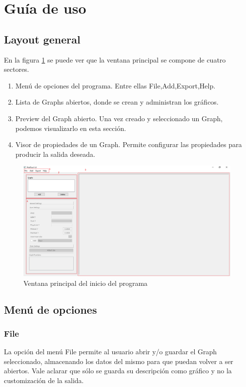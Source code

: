 \documentclass[a4paper,10pt]{article}
\begin{document}
\section{Gu\'ia de uso}

\subsection{Layout general}
En la figura \ref{fig:initial_window} se puede ver que la ventana principal se compone de cuatro sectores.
\begin{enumerate}
	\item Men\'u de opciones del programa. Entre ellas File,Add,Export,Help.
	\item Lista de Graphs abiertos, donde se crean y administran los gr\'aficos.
	\item Preview del Graph abierto. Una vez creado y seleccionado un Graph, podemos visualizarlo en esta secci\'on.
	\item Visor de propiedades de un Graph. Permite configurar las propiedades para producir la salida deseada.
\end{enumerate}

\begin{figure}[H]
	\begin{center}
	\includegraphics[scale=0.5]{resources/initial_window.png}
	\caption{Ventana principal del inicio del programa}
	\label{fig:initial_window}
	\end{center}
\end{figure}

\subsection{Men\'u de opciones}

\subsubsection{File}
La opci\'on del men\'u File permite al usuario abrir y/o guardar el Graph seleccionado, almacenando los datos del
mismo para que puedan volver a ser abiertos. Vale aclarar que s\'olo se guarda su descripci\'on como gr\'afico y no la customizaci\'on de la salida.
\end{document}
